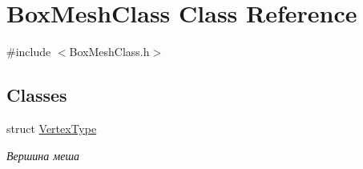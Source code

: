 \hypertarget{class_box_mesh_class}{}\section{Box\+Mesh\+Class Class Reference}
\label{class_box_mesh_class}


{\ttfamily \#include $<$Box\+Mesh\+Class.\+h$>$}

\subsection*{Classes}
\begin{DoxyCompactItemize}
\item 
struct \hyperlink{struct_box_mesh_class_1_1_vertex_type}{Vertex\+Type}
\begin{DoxyCompactList}\small\item\em Вершина меша \end{DoxyCompactList}\end{DoxyCompactItemize}
